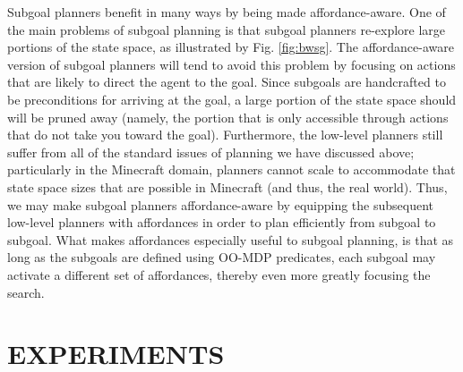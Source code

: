 \documentclass[]{article}
\newcommand{\stnote}[1]{\textcolor{Blue}{\textbf{ST: #1}}}
\newcommand{\jmnote}[1]{\textcolor{Green}{\textbf{JM: #1}}}
\begin{document}
Subgoal planners benefit in many ways by being made affordance-aware.
One of the main problems of subgoal planning is that subgoal planners
re-explore large portions of the state space, as illustrated by
Fig. \ref{fig:bwsg}. The affordance-aware version of subgoal planners
will tend to avoid this problem by focusing on actions that are likely
to direct the agent to the goal. Since subgoals are handcrafted to be
preconditions for arriving at the goal, a large portion of the state
space should will be pruned away (namely, the portion that is only
accessible through actions that do not take you toward the goal).
Furthermore, the low-level planners still suffer from all of the
standard issues of planning we have discussed above; particularly in
the Minecraft domain, planners cannot scale to accommodate that state
space sizes that are possible in Minecraft (and thus, the real
world). Thus, we may make subgoal planners affordance-aware by
equipping the subsequent low-level planners with affordances in order
to plan efficiently from subgoal to subgoal. What makes affordances
especially useful to subgoal planning, is that as long as the subgoals
are defined using OO-MDP predicates, each subgoal may activate a
different set of affordances, thereby even more greatly focusing the
search.






\section{EXPERIMENTS}

%
\end{document}
